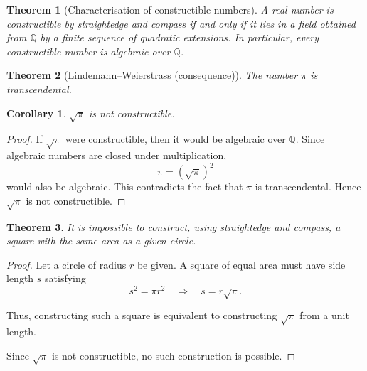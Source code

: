\documentclass{article}
\newtheorem*{theorem}{Theorem}
\newtheorem*{corollary}{Corollary}
\begin{document}
\begin{theorem}[Characterisation of constructible numbers]
    A real number is constructible by straightedge and compass if and only if it lies in a field obtained from $\mathbb{Q}$ by 
    a finite sequence of quadratic extensions. In particular, every constructible number is algebraic over $\mathbb{Q}$.
\end{theorem}

\begin{theorem}[Lindemann--Weierstrass (consequence)]
    The number $\pi$ is transcendental.
\end{theorem}

\begin{corollary}
    $\sqrt{\pi}$ is not constructible.
\end{corollary}

\begin{proof}
    If $\sqrt{\pi}$ were constructible, then it would be algebraic over $\mathbb{Q}$. 
    Since algebraic numbers are closed under multiplication,
    \[
    \pi = (\sqrt{\pi})^2
    \]
    would also be algebraic. This contradicts the fact that $\pi$ is transcendental. Hence $\sqrt{\pi}$ is not constructible.
    \end{proof}

    \begin{theorem}
    It is impossible to construct, using straightedge and compass, a square with the same area as a given circle.
    \end{theorem}

    \begin{proof}
    Let a circle of radius $r$ be given. A square of equal area must have side length $s$ satisfying
    \[
    s^2 = \pi r^2 \quad \Rightarrow \quad s = r\sqrt{\pi}.
    \]

    Thus, constructing such a square is equivalent to constructing $\sqrt{\pi}$ from a unit length.

    Since $\sqrt{\pi}$ is not constructible, no such construction is possible.
\end{proof}
\end{document}
